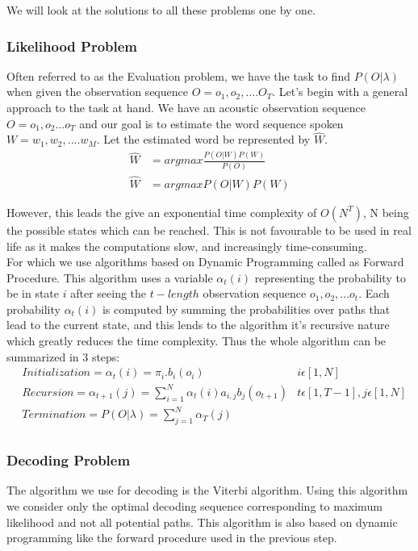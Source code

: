 \documentclass[10pt,twocolumn,letterpaper]{article}
\begin{document}
We will look at the solutions to all these problems one by one.
\subsubsection{Likelihood Problem}
Often referred to as the Evaluation problem, we have the task to find $P(O|\lambda)$ when given the observation sequence $O = o_1, o_2, .... O_T$. 
Let's begin with a general approach to the task at hand.
We have an acoustic observation sequence $O = o_1, o_2... o_T$ and our goal is to estimate the word sequence spoken $W = w_1, w_2, .... w_M$. Let the estimated word be represented by $\hat{W}$. \\
\begin{align*}
    \hat{W} &= argmax \frac{P(O|W)P(W)}{P(O)} \\
    \hat{W} &= argmax P(O|W)P(W)
\end{align*}

However, this leads the give an exponential time complexity of $O(N^T)$, N being the possible states which can be reached. This is not favourable to be used in real life as it makes the computations slow, and increasingly time-consuming. \\

For which we use algorithms based on Dynamic Programming called as Forward Procedure. This algorithm uses a variable
$\alpha_t(i)$ representing the probability to be in state $i$ after seeing the $t-length$ observation sequence $o_1, o_2,... o_t$. Each probability $\alpha_t(i)$ is computed by summing the probabilities over paths that lead to the current state, and this lends to the algorithm it's recursive nature which greatly reduces the time complexity. 
Thus the whole algorithm can be summarized in 3 steps: \\
\begin{align*}
    &Initialization = \alpha_t(i) = \pi_i.b_i(o_i) & i \epsilon [1, N]\\
    &Recursion = \alpha_{t+1}(j) = \sum_{i=1}^{N}\alpha_t(i)a_{i,j}b_j(o_{t+1})&t \epsilon [1, T-1], j \epsilon [1, N] \\
    &Termination = P(O|\lambda) = \sum_{j=1}^{N}\alpha_T(j)\\
\end{align*}

\subsubsection{Decoding Problem}
The algorithm we use for decoding is the Viterbi algorithm. Using this algorithm we consider only the optimal decoding sequence corresponding to maximum likelihood and not all potential paths. This algorithm is also based on dynamic programming like the forward procedure used in the previous step. \\
\end{document}
